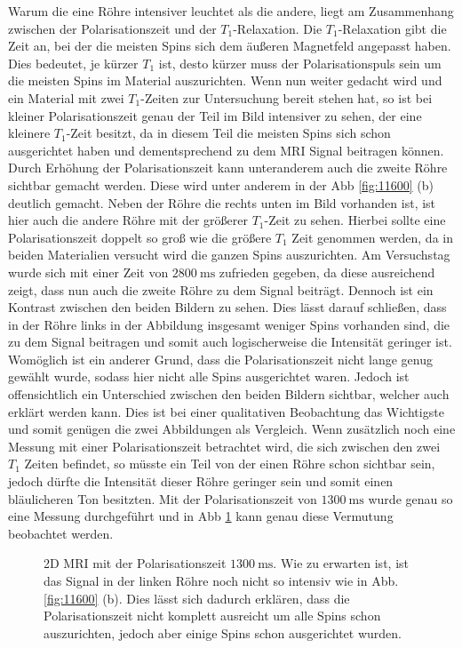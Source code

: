 Warum die eine Röhre intensiver leuchtet als die andere, liegt am Zusammenhang zwischen der Polarisationszeit und der $T_1$-Relaxation. Die $T_1$-Relaxation gibt die Zeit an, bei der die meisten Spins sich dem äußeren Magnetfeld angepasst haben. Dies bedeutet, je kürzer $T_1$ ist, desto kürzer muss der Polarisationspuls sein um die meisten Spins im Material auszurichten. Wenn nun weiter gedacht wird und ein Material mit zwei $T_1$-Zeiten zur Untersuchung bereit stehen hat, so ist bei kleiner Polarisationszeit genau der Teil im Bild intensiver zu sehen, der eine kleinere $T_1$-Zeit besitzt, da in diesem Teil die meisten Spins sich schon ausgerichtet haben und dementsprechend zu dem MRI Signal beitragen können.\\
Durch Erhöhung der Polarisationszeit kann unteranderem auch die zweite Röhre sichtbar gemacht werden. Diese wird unter anderem in der Abb \ref{fig:11600} (b)  deutlich gemacht. Neben der Röhre die rechts unten im Bild vorhanden ist, ist hier auch die andere Röhre mit der größerer $T_1$-Zeit zu sehen. Hierbei sollte eine Polarisationszeit doppelt so groß wie die größere $T_1$ Zeit genommen werden, da in beiden Materialien versucht wird die ganzen Spins auszurichten. Am Versuchstag wurde sich mit einer Zeit von $\SI{2800}{\milli\second}$ zufrieden gegeben, da diese ausreichend zeigt, dass nun auch die zweite Röhre zu dem Signal beiträgt. Dennoch ist ein Kontrast zwischen den beiden Bildern zu sehen. Dies lässt darauf schließen, dass in der Röhre links in der Abbildung insgesamt weniger Spins vorhanden sind, die zu dem Signal beitragen und somit auch logischerweise die Intensität geringer ist. Womöglich ist ein anderer Grund, dass die Polarisationszeit nicht lange genug gewählt wurde, sodass hier nicht alle Spins ausgerichtet waren. Jedoch ist offensichtlich ein Unterschied zwischen den beiden Bildern sichtbar, welcher auch erklärt werden kann. Dies ist bei einer qualitativen Beobachtung das Wichtigste und somit genügen die zwei Abbildungen als Vergleich. Wenn zusätzlich noch eine Messung mit einer Polarisationszeit betrachtet wird, die sich zwischen den zwei $T_1$ Zeiten befindet, so müsste ein Teil von der einen Röhre schon sichtbar sein, jedoch dürfte die Intensität dieser Röhre geringer sein und somit einen bläulicheren Ton besitzten. Mit der Polarisationszeit von $\SI{1300}{\milli\second}$ wurde genau so eine Messung durchgeführt und in Abb \ref{fig: 1300} kann genau diese Vermutung beobachtet werden.
    \begin{figure}[H]
        \centering
        
        \caption[2D MRI mit der Polarisationszeit $\SI{1300}{\milli\second}$]{2D MRI mit der Polarisationszeit $\SI{1300}{\milli\second}$. Wie zu erwarten ist, ist das Signal in der linken Röhre noch nicht so intensiv wie in Abb. \ref{fig:11600} (b). Dies lässt sich dadurch erklären, dass die Polarisationszeit nicht komplett ausreicht um alle Spins schon auszurichten, jedoch aber einige Spins schon ausgerichtet wurden.}
        \label{fig: 1300}
    \end{figure}
